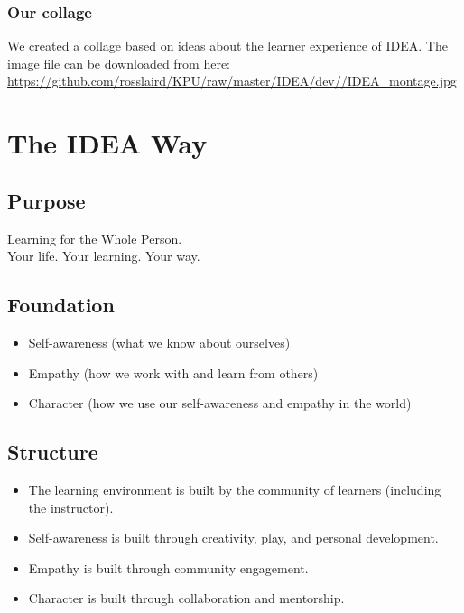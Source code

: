 \documentclass[letterpaper,10pt,headsepline]{scrreprt}
\begin{document}
\subsection{Our collage}

We created a collage based on ideas about the learner experience of IDEA. The image file can be downloaded from here:\\
\url{https://github.com/rosslaird/KPU/raw/master/IDEA/dev//IDEA_montage.jpg} 

\chapter{The IDEA Way}

\section{Purpose}

Learning for the Whole Person.\\
Your life. Your learning. Your way.

\section{Foundation}

\begin{itemize}
\itemsep1pt\parskip0pt
\item
  Self-awareness (what we know about ourselves)
\item
  Empathy (how we work with and learn from others)
\item
  Character (how we use our self-awareness and empathy in the world)
\end{itemize}

\section{Structure}

\begin{itemize}
\itemsep1pt\parskip0pt
\item
  The learning environment is built by the community of learners
  (including the instructor).
\item
  Self-awareness is built through creativity, play, and personal
  development.
\item
  Empathy is built through community engagement.
\item
  Character is built through collaboration and mentorship.
\end{itemize}
\end{document}
